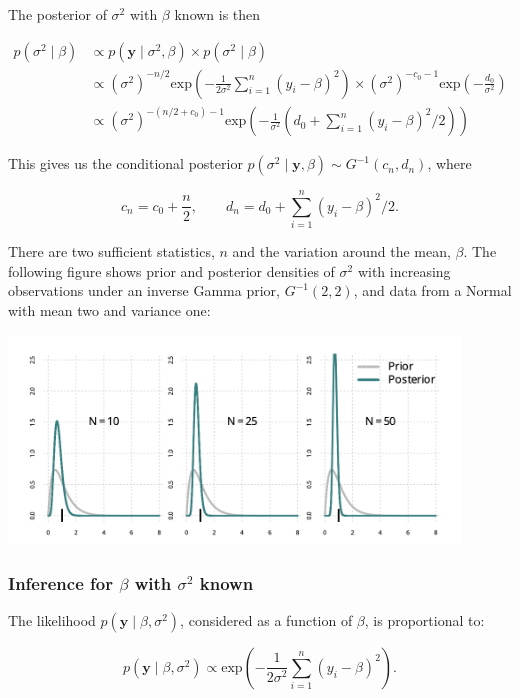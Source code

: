 The posterior of $\sigma^2$ with $\beta$ known is then 

\begin{align*}
	p(\sigma^2\mid\beta) &\propto p(\bm{y}\mid\sigma^2,\beta) \times p(\sigma^2\mid\beta) \\
	& \propto (\sigma^2)^{-n/2}\mathrm{exp}\left(-\frac{1}{2\sigma^2}\sum^n_{i=1}(y_i-\beta)^2\right)\times (\sigma^2)^{-c_0-1}\mathrm{exp}\left(-\frac{d_0}{\sigma^2}\right) \\
	& \propto (\sigma^2)^{-(n/2+c_0)-1}\mathrm{exp}\left(-\frac{1}{\sigma^2}\left(d_0 + \sum^n_{i=1}(y_i-\beta)^2/2\right)\right)
\end{align*}

This gives us the conditional posterior $p(\sigma^2\mid\bm{y},\beta)\sim G^{-1}(c_n,d_n)$, where 

\[
	c_n = c_0 + \frac{n}{2}, \qquad d_n = d_0 + \sum^n_{i=1}(y_i -\beta)^2/2.
\]

There are two sufficient statistics, $n$ and the variation around the mean, $\beta$. The following figure shows prior and posterior densities of $\sigma^2$ with increasing observations under an inverse Gamma prior, $G^{-1} (2,2)$, and data from a Normal with mean two and variance one:

\begin{center}
	\includegraphics[width = 12cm]{inversegamma.png}
\end{center}

\subsubsection{Inference for $\beta$ with $\sigma^2$ known}

The likelihood $p(\bm{y}\mid\beta,\sigma^2)$, considered as a function of $\beta$, is proportional to:

\[
	p(\bm{y}\mid\beta,\sigma^2)  \propto \mathrm{exp}\left(-\frac{1}{2\sigma^2}\sum^n_{i=1}(y_i-\beta)^2\right).
\]

